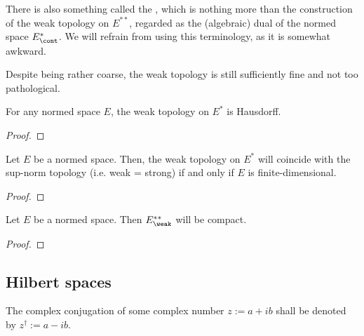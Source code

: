         \begin{convention}
            There is also something called the , which is nothing more than the construction of the weak topology on $E^{**}$, regarded as the (algebraic) dual of the normed space $E^*_{\cont}$. We will refrain from using this terminology, as it is somewhat awkward.
        \end{convention}
        Despite being rather coarse, the weak topology is still sufficiently fine and not too pathological.
        \begin{lemma} \label{lemma: weak_topology_is_hausdorff}
            For any normed space $E$, the weak topology on $E^*$ is Hausdorff.
        \end{lemma}
            \begin{proof}
            \end{proof}
        \begin{theorem} \label{theorem: finite_dimensional_weak_duality}
            Let $E$ be a normed space. Then, the weak topology on $E^*$ will coincide with the sup-norm topology (i.e. weak = strong) if and only if $E$ is finite-dimensional.
        \end{theorem}
            \begin{proof}
                
            \end{proof}
        \begin{theorem} \label{theorem: banach_alaoglu}
            Let $E$ be a normed space. Then $E^{**}_{\weak}$ will be compact.
        \end{theorem}
            \begin{proof}
                
            \end{proof}

    \subsection{Hilbert spaces}
        \begin{convention}
            The complex conjugation of some complex number $z := a + ib$ shall be denoted by $z^{\dagger} := a - ib$.
        \end{convention}
    
